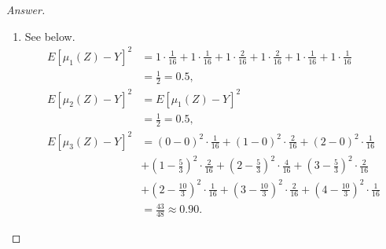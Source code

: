 \documentclass{amsbook}
\theoremstyle{definition}
\theoremstyle{remark}
\numberwithin{section}{chapter}
\numberwithin{equation}{chapter}
\begin{document}
\begin{proof}[Answer]
\begin{enumerate}[label=(\alph*)]
\[\begin{split}
\text{Cov}(Z,Y)&=E(ZY)-E(Z)E(Y)=\frac{40}{16}-\frac{16}{16}\cdot\frac{32}{16}=\frac{1}{2},\\
\text{Var }Z&=E(Z^2)-(E(Z))^2=\frac{24}{16}-(\frac{16}{16})^2=\frac{1}{2}.
\end{split}
\]By Theorem~1.4.1 of \cite{bickel2015mathematical}, the following function $\mu_1$ is the best predictor:\[
\mu_1(z)\equiv E(Y|Z=z).
\]By Theorem~1.4.3 of \cite{bickel2015mathematical}, the following functions $\mu_2,\mu_3$ are the best linear predictor and the best zero intercept linear predictor, respectively:\[
\begin{split}
\mu_2(z)&\equiv a_1+b_1z,\\
\mu_3(z)&\equiv b_0z,
\end{split}
\]where\[
\begin{split}
b_0&\equiv\frac{E(ZY)}{E(Z^2)}=\frac{5}{3},\\
b_1&\equiv\frac{\text{Cov}(Z,Y)}{\text{Var }Z}=1,\\
a_1&\equiv E(Y)-b_1E(Z)=1.
\end{split}
\]
\item See below.\[
\begin{split}
E[\mu_1(Z)-Y]^2&=1\cdot\frac{1}{16}+1\cdot\frac{1}{16}+1\cdot\frac{2}{16}+1\cdot\frac{2}{16}+1\cdot\frac{1}{16}+1\cdot\frac{1}{16}\\
&=\frac{1}{2}=0.5,\\
E[\mu_2(Z)-Y]^2&=E[\mu_1(Z)-Y]^2\\
&=\frac{1}{2}=0.5,\\
E[\mu_3(Z)-Y]^2&=\left(0-0\right)^2\cdot\frac{1}{16}+\left(1-0\right)^2\cdot\frac{2}{16}+\left(2-0\right)^2\cdot\frac{1}{16}\\
&+\left(1-\frac{5}{3}\right)^2\cdot\frac{2}{16}+\left(2-\frac{5}{3}\right)^2\cdot\frac{4}{16}+\left(3-\frac{5}{3}\right)^2\cdot\frac{2}{16}\\
&+\left(2-\frac{10}{3}\right)^2\cdot\frac{1}{16}+\left(3-\frac{10}{3}\right)^2\cdot\frac{2}{16}+\left(4-\frac{10}{3}\right)^2\cdot\frac{1}{16}\\
&= \frac{43}{48}\approx 0.90.
\end{split}
\]
\end{enumerate}
\end{proof}
\end{document}
